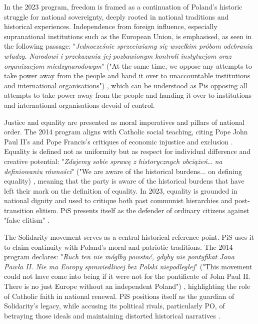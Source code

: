 In the 2023 program, freedom is framed as a continuation of Poland's historic struggle for national sovereignty, deeply rooted in national traditions and historical experiences. Independence from foreign influence, especially supranational institutions such as the European Union, is emphasised, as seen in the following passage: "\textit{Jednocześnie sprzeciwiamy się wszelkim próbom odebrania władzy. Narodowi i przekazania jej pozbawionym kontroli instytucjom oraz organizacjom miedzynarodowym}" ("At the same time, we oppose any attempts to take power away from the people and hand it over to unaccountable institutions and international organisations") \citep{pis_program_2023}, which can be understood as Pis opposing all attempts to take power away from the people and handing it over to institutions and international organisations devoid of control.

Justice and equality are presented as moral imperatives and pillars of national order. The 2014 program aligns with Catholic social teaching, citing Pope John Paul II's and Pope Francis's critiques of economic injustice and exclusion \citep{pis_program_2014}. Equality is defined not as uniformity but as respect for individual difference and creative potential: "\textit{Zdajemy sobie sprawę z historycznych obciążeń… na definiowaniu równości}" ("We are aware of the historical burdens... on defining equality) \citep{pis_program_2014}, meaning that the party is aware of the historical burdens that have left their mark on the definition of equality. In 2023, equality is grounded in national dignity and used to critique both past communist hierarchies and post-transition elitism. PiS presents itself as the defender of ordinary citizens against "false elitism" \citep{pis_program_2023}.

The Solidarity movement serves as a central historical reference point. PiS uses it to claim continuity with Poland's moral and patriotic traditions. The 2014 program declares: "\textit{Ruch ten nie mógłby powstać, gdyby nie pontyfikat Jana Pawła II. Nie ma Europy sprawiedliwej bez Polski niepodległej}" ("This movement could not have come into being if it were not for the pontificate of John Paul II. There is no just Europe without an independent Poland") \citep{pis_program_2014}, highlighting the role of Catholic faith in national renewal. PiS positions itself as the guardian of Solidarity's legacy, while accusing its political rivals, particularly PO,  of betraying those ideals and maintaining distorted historical narratives \citep{pis_program_2023}.

